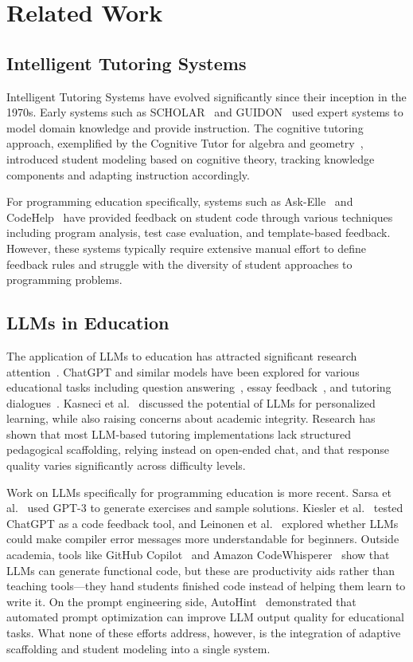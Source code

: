 \documentclass[journal,article,submit,pdftex,moreauthors]{Definitions/mdpi}
\begin{document}
\section{Related Work}

\subsection{Intelligent Tutoring Systems}

Intelligent Tutoring Systems have evolved significantly since their inception in the 1970s. Early systems such as SCHOLAR~\cite{ref9} and GUIDON~\cite{ref10} used expert systems to model domain knowledge and provide instruction. The cognitive tutoring approach, exemplified by the Cognitive Tutor for algebra and geometry~\cite{ref11}, introduced student modeling based on cognitive theory, tracking knowledge components and adapting instruction accordingly.

For programming education specifically, systems such as Ask-Elle~\cite{ref12} and CodeHelp~\cite{ref13} have provided feedback on student code through various techniques including program analysis, test case evaluation, and template-based feedback. However, these systems typically require extensive manual effort to define feedback rules and struggle with the diversity of student approaches to programming problems.

\subsection{LLMs in Education}

The application of LLMs to education has attracted significant research attention~\cite{ref14}. ChatGPT and similar models have been explored for various educational tasks including question answering~\cite{ref15}, essay feedback~\cite{ref16}, and tutoring dialogues~\cite{ref17}. Kasneci et al.~\cite{ref5} discussed the potential of LLMs for personalized learning, while also raising concerns about academic integrity. Research has shown that most LLM-based tutoring implementations lack structured pedagogical scaffolding, relying instead on open-ended chat, and that response quality varies significantly across difficulty levels.

Work on LLMs specifically for programming education is more recent. Sarsa et al.~\cite{ref18} used GPT-3 to generate exercises and sample solutions. Kiesler et al.~\cite{ref19} tested ChatGPT as a code feedback tool, and Leinonen et al.~\cite{ref20} explored whether LLMs could make compiler error messages more understandable for beginners. Outside academia, tools like GitHub Copilot~\cite{ref21} and Amazon CodeWhisperer~\cite{ref22} show that LLMs can generate functional code, but these are productivity aids rather than teaching tools---they hand students finished code instead of helping them learn to write it. On the prompt engineering side, AutoHint~\cite{ref23} demonstrated that automated prompt optimization can improve LLM output quality for educational tasks. What none of these efforts address, however, is the integration of adaptive scaffolding and student modeling into a single system.
\end{document}
